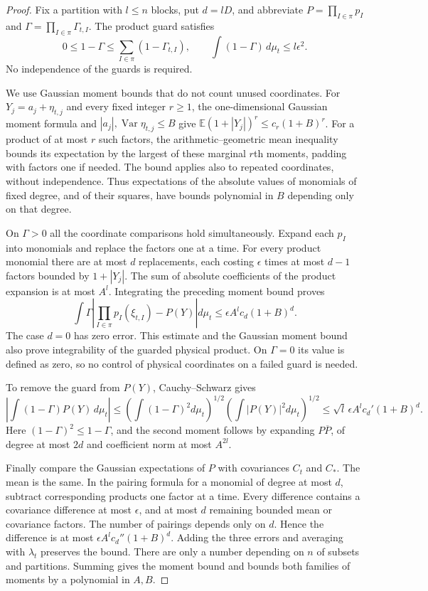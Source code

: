 \begin{proof}
Fix a partition with $l\le n$ blocks, put $d=lD$, and abbreviate
$P=\prod_{I\in\pi}p_I$ and $\Gamma=\prod_{I\in\pi}\Gamma_{t,I}$.
The product guard satisfies
\[
 0\le1-\Gamma\le\sum_{I\in\pi}(1-\Gamma_{t,I}),\qquad
                   \int(1-\Gamma)\,d\mu_t\le l\epsilon^2.
\]
No independence of the guards is required.

We use Gaussian moment bounds that do not count unused coordinates.
For $Y_j=a_j+\eta_{t,j}$ and every fixed integer $r\ge1$, the
one-dimensional Gaussian moment formula and $|a_j|,\operatorname{Var}
\eta_{t,j}\le B$ give
$\mathbb E(1+|Y_j|)^r\le c_r(1+B)^r$.
For a product of at most $r$ such factors, the arithmetic--geometric
mean inequality bounds its expectation by the largest of these marginal
$r$th moments, padding with factors one if needed. The bound applies
also to repeated coordinates, without independence. Thus expectations
of the absolute values of monomials of fixed degree, and of their
squares, have bounds polynomial in $B$ depending only on that degree.

On $\Gamma>0$ all the coordinate comparisons hold simultaneously.
Expand each $p_I$ into monomials and replace the factors one at a time.
For every product monomial there are at most $d$ replacements, each
costing $\epsilon$ times at most $d-1$ factors bounded by
$1+|Y_j|$. The sum of absolute coefficients of the product expansion
is at most $A^l$. Integrating the preceding moment bound proves
\[
 \int\Gamma\left|\prod_{I\in\pi}p_I(\xi_{t,I})-P(Y)\right|d\mu_t
                           \le\epsilon A^l c_d(1+B)^d.
\]
The case $d=0$ has zero error. This estimate and the Gaussian moment
bound also prove integrability of the guarded physical product.
On $\Gamma=0$ its value is defined as zero, so no control of physical
coordinates on a failed guard is needed.

To remove the guard from $P(Y)$, Cauchy--Schwarz gives
\[
 \left|\int(1-\Gamma)P(Y)\,d\mu_t\right|
 \le\left(\int(1-\Gamma)^2d\mu_t\right)^{1/2}
                  \left(\int|P(Y)|^2d\mu_t\right)^{1/2}
 \le\sqrt l\,\epsilon A^l c_d'(1+B)^d.
\]
Here $(1-\Gamma)^2\le1-\Gamma$, and the second moment follows by
expanding $P\overline P$, of degree at most $2d$ and coefficient
norm at most $A^{2l}$.

Finally compare the Gaussian expectations of $P$ with covariances
$C_t$ and $C_*$. The mean is the same. In the pairing formula for a
monomial of degree at most $d$, subtract corresponding products one
factor at a time. Every difference contains a covariance difference
at most $\epsilon$, and at most $d$ remaining bounded mean or
covariance factors. The number of pairings depends only on $d$.
Hence the difference is at most
$\epsilon A^l c_d''(1+B)^d$.
Adding the three errors and averaging with $\lambda_t$ preserves the
bound. There are only a number depending on $n$ of subsets and
partitions. Summing gives the moment bound and bounds both families
of moments by a polynomial in $A,B$.


\end{proof}
